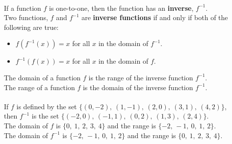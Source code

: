 \begin{myDefinition}
\begin{minipage}{0.5\linewidth}
\begin{center}
				\label{fig:inv-def2}
			\end{center}
		\end{minipage}
\end{myDefinition}

\begin{myDefinition}~\\[0.5mm]
If a function $f$ is one-to-one, then the function has an {\bf inverse}, $f^{-1}$.\\

Two functions, $f$ and $f^{-1}$ are {\bf inverse functions} if and only if both of the following are true:
\begin{itemize}
\item $f\left(f^{-1}(x)\right) = x$ for all $x$ in the domain of $f^{-1}$.
\item $f^{-1}\left(f(x)\right) = x$ for all $x$ in the domain of $f$.
\end{itemize}
The domain of a function $f$ is the range of the inverse function $f^{-1}$.\\
The range of a function $f$ is the domain of the inverse function $f^{-1}$.\\[0.5em]
 \\
If $f$ is defined by the set $\{ (0,-2), ~ (1, -1), ~ (2, 0), ~ (3, 1),~ (4,2) \}$, \\
then $f^{-1}$ is the set $\{ (-2,0), ~ (-1, 1), ~ (0, 2), ~ (1, 3),~ (2,4) \}$.\\[0.3em]
The domain of $f$ is $\{ 0, ~ 1, ~ 2, ~ 3, ~ 4 \}$ and the range is $\{ -2, \, -1, ~ 0, ~ 1,~ 2 \}$.\\[0.3em]
The domain of $f^{-1}$ is $\{ -2, \, -1, ~ 0, ~ 1,~ 2 \}$ and the range is $\{ 0, ~ 1, ~ 2, ~ 3, ~ 4 \}$.\\

\end{myDefinition}






